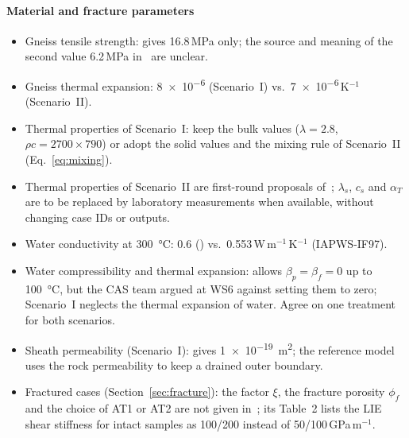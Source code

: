 \documentclass[11pt,a4paper]{article}
\newcommand{\open}{$\square$}
\begin{document}
\begin{itemize}
\paragraph{Material and fracture parameters}
\begin{itemize}[label=\open]
  \item Gneiss tensile strength: \cite{Mollaali2026} gives 16.8\,MPa only; the
        source and meaning of the second value 6.2\,MPa in~\cite{Pan2026} are
        unclear.
  \item Gneiss thermal expansion: \num{8e-6} (Scenario~I) vs.\
        \num{7e-6}\,K$^{-1}$ (Scenario~II).
  \item Thermal properties of Scenario~I: keep the bulk values
        ($\lambda=2.8$, $\rho c=2700\times790$) or adopt the solid values and
        the mixing rule of Scenario~II (Eq.~\eqref{eq:mixing}).
  \item Thermal properties of Scenario~II are first-round proposals
        of~\cite{Pan2026}; $\lambda_s$, $c_s$ and $\alpha_T$ are to be replaced
        by laboratory measurements when available, without changing case IDs
        or outputs.
  \item Water conductivity at \SI{300}{\celsius}: 0.6 (\cite{Pan2026}) vs.\
        0.553\,W\,m$^{-1}$\,K$^{-1}$ (IAPWS-IF97).
  \item Water compressibility and thermal expansion: \cite{Pan2026} allows
        $\beta_p=\beta_f=0$ up to \SI{100}{\celsius}, but the CAS team argued at
        WS6 against setting them to zero; Scenario~I neglects the thermal
        expansion of water. Agree on one treatment for both scenarios.
  \item Sheath permeability (Scenario~I): \cite{Mollaali2026} gives
        \SI{1e-19}{m^2}; the reference model uses the rock permeability to keep
        a drained outer boundary.
  \item Fractured cases (Section~\ref{sec:fracture}): the factor $\xi$, the
        fracture porosity $\phi_f$ and the choice of AT1 or AT2 are not given
        in~\cite{Mollaali2026}; its Table~2 lists the LIE shear stiffness for
        intact samples as 100/200 instead of 50/100\,GPa\,m$^{-1}$.
\end{itemize}


\end{itemize}
\end{document}
